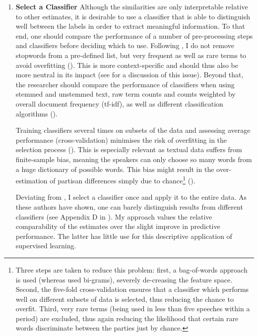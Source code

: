 \documentclass{article}
\begin{document}
\begin{enumerate}
    \item \textbf{Select a Classifier} \newline Although the similarities are only interpretable relative to other estimates, it is desirable to use a classifier that is able to distinguish well between the labels in order to extract meaningful information. To that end, one should compare the performance of a number of pre-processing steps and classifiers before deciding which to use. Following \citeauthor{Peterson2018}, I do not remove stopwords from a pre-defined list, but very frequent as well as rare terms to avoid overfitting (\citeyear{Peterson2018}). This is more context-specific and should thus also be more neutral in its impact (see \cite{Schoonvelde2019a} for a discussion of this issue). Beyond that, the researcher should compare the performance of classifiers when using stemmed and unstemmed text, raw term counts and counts weighted by overall document frequency (tf-idf), as well as different classification algorithms (\cite{Denny2018}).\par 
    Training classifiers several times on subsets of the data and assessing average performance (cross-validation) minimises the risk of overfitting in the selection process (\cite{Breiman1989}). This is especially relevant as textual data suffers from finite-sample bias, meaning the speakers can only choose so many words from a huge dictionary of possible words. This bias might result in the over-estimation of partisan differences simply due to chance\footnote{Three steps are taken to reduce this problem: first, a bag-of-words approach is used (whereas \citeauthor{Gentzkow2019} used bi-grams), severely de-creasing the feature space. Second, the five-fold cross-validation ensures that a classifier which performs well on different subsets of data is selected, thus reducing the chance to overfit. Third, very rare terms (being used in less than five speeches within a period) are excluded, thus again reducing the likelihood that certain rare words discriminate between the parties just by chance.} (\cite{Gentzkow2019}).  \par
    Deviating from \citeauthor{Peterson2018}, I select a classifier once and apply it to the entire data. As these authors have shown, one can barely distinguish results from different classifiers (see Appendix D in \cite{Peterson2018}). My approach values the relative comparability of the estimates over the slight improve in predictive performance. The latter has little use for this descriptive application of supervised learning. \par

\end{enumerate}
\end{document}

